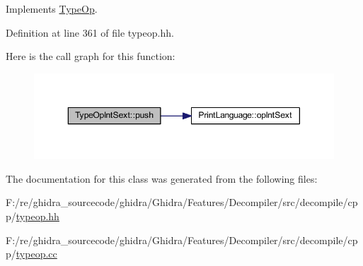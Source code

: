 Implements \mbox{\hyperlink{class_type_op_ac9c9544203ed74dabe6ac662b653b2af}{Type\+Op}}.



Definition at line 361 of file typeop.\+hh.

Here is the call graph for this function\+:
\nopagebreak
\begin{figure}[H]
\begin{center}
\leavevmode
\includegraphics[width=350pt]{class_type_op_int_sext_a4d2972f2739cfc477d2f9762c94417c0_cgraph}
\end{center}
\end{figure}


The documentation for this class was generated from the following files\+:\begin{DoxyCompactItemize}
\item 
F\+:/re/ghidra\+\_\+sourcecode/ghidra/\+Ghidra/\+Features/\+Decompiler/src/decompile/cpp/\mbox{\hyperlink{typeop_8hh}{typeop.\+hh}}\item 
F\+:/re/ghidra\+\_\+sourcecode/ghidra/\+Ghidra/\+Features/\+Decompiler/src/decompile/cpp/\mbox{\hyperlink{typeop_8cc}{typeop.\+cc}}\end{DoxyCompactItemize}

